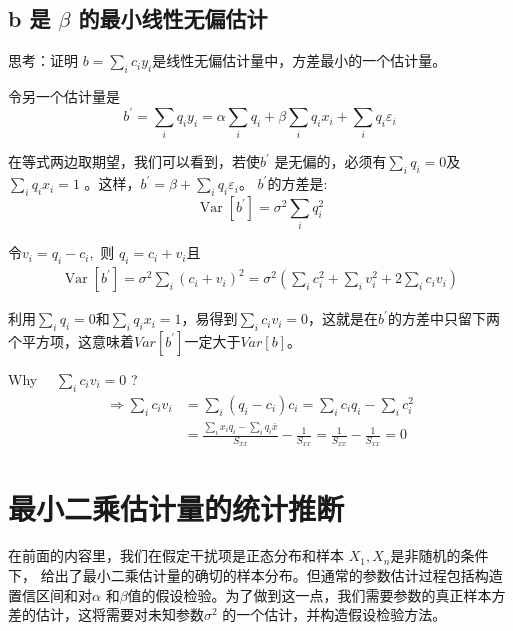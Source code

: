 {\subsection{b 是 \texorpdfstring{$\beta$}{β}  的最小线性无偏估计}  }

思考：证明 $b = \sum_{i}c_{i} y_{i} $是线性无偏估计量中，方差最小的一个估计量。
\begin{myproof}
    令另一个估计量是 
    $$b^{\prime}=\sum_{i} q_{i} y_{i}=\alpha \sum_{i} q_{i}+\beta \sum_{i} q_{i} x_{i}+\sum_{i} q_{i} \varepsilon_{i}$$

    在等式两边取期望，我们可以看到，若使$ b^{\prime} $ 是无偏的，必须有$ \sum_{i}q_{i} = 0 $及 $ \sum_{i}q_{i}x_{i} =1$ 。这样，$ b^{\prime} = \beta + \sum_{i}q_{i}\varepsilon_{i} $。 $ b^{\prime} $的方差是:
    $$ \operatorname{Var}\left[b^{\prime}\right]=\sigma^{2} \sum_{i} q_{i}^{2} $$

    令$ v_{i}=q_{i}-c_{i},$  则   $ q_{i}=c_{i}+v_{i} $且
    $$ \begin{array}{c}
        \operatorname{Var}\left[b^{\prime}\right]=\sigma^{2} \sum_{i}\left(c_{i}+v_{i}\right)^{2} 
        =\sigma^{2}\left(\sum_{i} c_{i}^{2}+\sum_{i} v_{i}^{2}+2 \sum_{i} c_{i} v_{i}\right)
        \end{array} $$

    利用$ \sum_{i} q_{i} = 0 $和$\sum_{i} q_{i} x_{i} =1 $，易得到$\sum_{i} c_{i}v_{i} = 0$，这就是在$ b^{\prime} $的方差中只留下两个平方项，这意味着$Var[b^{\prime}]$一定大于$Var[b]$。

    Why  \ \ $\sum_{i} c_{i}v_{i} = 0$ ?
    \begin{align*}
        \Longrightarrow \sum_{i} c_{i} v_{i}&  =\sum_{i}\left(q_{i}-c_{i}\right) c_{i}=\sum_{i} c_{i} q_{i}-\sum_{i} c_{i}^{2} \\
         &=\frac{\sum_{i} x_{i} q_{i}-\sum_{i} q_{i} \bar{x}}{S_{x x}}-\frac{1}{S_{x x}}=\frac{1}{S_{x x}}-\frac{1}{S_{x x}}=0
    \end{align*}

\end{myproof}

\section{最小二乘估计量的统计推断}

在前面的内容里，我们在假定干扰项是正态分布和样本 $X_{1},X_{n} $是非随机的条件下， 给出了最小二乘估计量的确切的样本分布。但通常的参数估计过程包括构造置信区间和对$ \alpha $ 和$ \beta $值的假设检验。为了做到这一点，我们需要参数的真正样本方差的估计，这将需要对未知参数$ \sigma^{2} $ 的一个估计，并构造假设检验方法。

